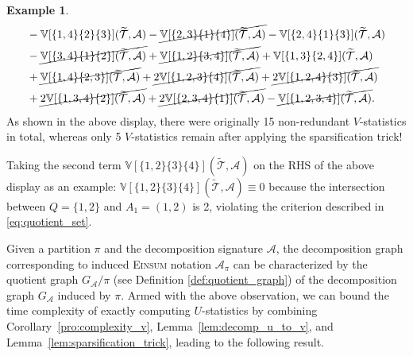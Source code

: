 \documentclass[sn-mathphys, natbib=false]{sn-jnl}
\theoremstyle{plain}
\theoremstyle{definition}
\newtheorem{subexample}{Example}
\def\Einsum{\textsc{Einsum}}
\newcommand{\vstat}{\mathbb{V}}
\def\calA{\mathcal{A}}
\def\calT{\mathcal{T}}
\begin{document}
\begin{bibunit}[agsm]
\begin{subexample}
\begin{align*}
& - \vstat[\{1,4\}\{2\}\{3\}](\widetilde{ \calT }, \calA) - \cancel{\vstat[\{2,3\}\{1\}\{4\}](\widetilde{ \calT }, \calA)}
- \vstat[\{2,4\}\{1\}\{3\}](\widetilde{ \calT }, \calA)
 \\
& 
- \cancel{\vstat[\{3,4\}\{1\}\{2\}](\widetilde{ \calT }, \calA)}
+ \cancel{\vstat[\{1,2\}\{3,4\}](\widetilde{ \calT }, \calA)}
+ \vstat[\{1,3\}\{2,4\}](\widetilde{ \calT }, \calA)
 \\
& 
+ \cancel{\vstat[\{1,4\}\{2,3\}](\widetilde{ \calT }, \calA)}
+ \cancel{2\vstat[\{1,2,3\}\{4\}](\widetilde{ \calT }, \calA)}
+ \cancel{2\vstat[\{1,2,4\}\{3\}](\widetilde{ \calT }, \calA)} \\
& 
+ \cancel{2\vstat[\{1,3,4\}\{2\}](\widetilde{ \calT }, \calA)}
+ \cancel{2\vstat[\{2,3,4\}\{1\}](\widetilde{ \calT }, \calA)}
- \cancel{\vstat[\{1,2,3,4\}](\widetilde{ \calT }, \calA)}.
\end{align*}
As shown in the above display, there were originally 15 non-redundant $V$-statistics in total, whereas only 5 $V$-statistics remain after applying the sparsification trick! 

Taking the second term $\vstat[\{1,2\}\{3\}\{4\}](\widetilde{ \calT }, \calA)$ on the RHS of the above display as an example: $\vstat[\{1,2\}\{3\}\{4\}](\widetilde{ \calT }, \calA) \equiv 0$ because the intersection between $Q = \{1, 2\}$ and $A_1 = (1, 2)$ is 2, violating the criterion described in \eqref{eq:quotient_set}.
\end{subexample}



Given a partition $\pi$ and the decomposition signature $\calA$, the decomposition graph corresponding to induced \Einsum{} notation $\calA_\pi$ can be characterized by the quotient graph $G_\calA / \pi$ (see Definition \ref{def:quotient_graph}) of the decomposition graph $G_\calA$ induced by $\pi$. Armed with the above observation, we can bound the time complexity of exactly computing $U$-statistics by combining Corollary~\ref{pro:complexity_v}, Lemma~\ref{lem:decomp_u_to_v}, and Lemma~\ref{lem:sparsification_trick}, leading to the following result.


\end{bibunit}
\end{document}
